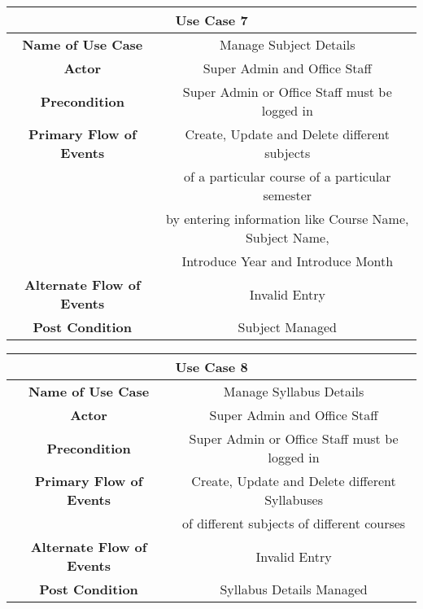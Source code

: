 \vspace{1cm}
\begin{center}
    \begin{tabular}{|c|c|}
        \hline
        \multicolumn{2}{|c|}{Use Case 7} \\
        \hline
        \textbf{Name of Use Case} & Manage Subject Details \\
        \hline
        \textbf{Actor} & Super Admin and Office Staff \\
        \hline
        \textbf{Precondition} & Super Admin or Office Staff must be logged in \\
        \hline
        \textbf{Primary Flow of Events} & Create, Update and Delete different subjects \\
        & of a particular course of a particular semester \\
        & by entering information like Course Name, Subject Name, \\
        & Introduce Year and Introduce Month \\
        \hline
        \textbf{Alternate Flow of Events} & Invalid Entry \\
        \hline
        \textbf{Post Condition} & Subject Managed \\
        \hline
    \end{tabular}
\end{center}

\vspace{1cm}
\begin{center}
    \begin{tabular}{|c|c|}
        \hline
        \multicolumn{2}{|c|}{Use Case 8} \\
        \hline
        \textbf{Name of Use Case} & Manage Syllabus Details \\
        \hline
        \textbf{Actor} & Super Admin and Office Staff \\
        \hline
        \textbf{Precondition} & Super Admin or Office Staff must be logged in \\
        \hline
        \textbf{Primary Flow of Events} & Create, Update and Delete different Syllabuses\\
        & of different subjects of different courses \\
        \hline
        \textbf{Alternate Flow of Events} & Invalid Entry \\
        \hline
        \textbf{Post Condition} & Syllabus Details Managed \\
        \hline
    \end{tabular}
\end{center}


